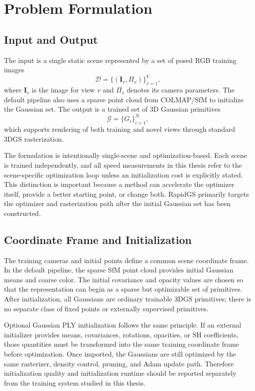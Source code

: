 \chapter{Problem Formulation}
\label{chap:problem-formulation}

\section{Input and Output}

The input is a single static scene represented by a set of posed RGB training images
\begin{equation}
\mathcal{D}=\{(\mathbf{I}_v,\Pi_v)\}_{v=1}^{V},
\end{equation}
where $\mathbf{I}_v$ is the image for view $v$ and $\Pi_v$ denotes its camera parameters. The default pipeline also uses a sparse point cloud from COLMAP/SfM to initialize the Gaussian set. The output is a trained set of 3D Gaussian primitives
\begin{equation}
\mathcal{G}=\{G_i\}_{i=1}^{N},
\end{equation}
which supports rendering of both training and novel views through standard 3DGS rasterization.

The formulation is intentionally single-scene and optimization-based. Each scene is trained independently, and all speed measurements in this thesis refer to the scene-specific optimization loop unless an initialization cost is explicitly stated. This distinction is important because a method can accelerate the optimizer itself, provide a better starting point, or change both. RapidGS primarily targets the optimizer and rasterization path after the initial Gaussian set has been constructed.

\section{Coordinate Frame and Initialization}

The training cameras and initial points define a common scene coordinate frame. In the default pipeline, the sparse SfM point cloud provides initial Gaussian means and coarse color. The initial covariance and opacity values are chosen so that the representation can begin as a sparse but optimizable set of primitives. After initialization, all Gaussians are ordinary trainable 3DGS primitives; there is no separate class of fixed points or externally supervised primitives.

Optional Gaussian PLY initialization follows the same principle. If an external initializer provides means, covariances, rotations, opacities, or SH coefficients, those quantities must be transformed into the same training coordinate frame before optimization. Once imported, the Gaussians are still optimized by the same rasterizer, density control, pruning, and Adam update path. Therefore initialization quality and initialization runtime should be reported separately from the training system studied in this thesis.

